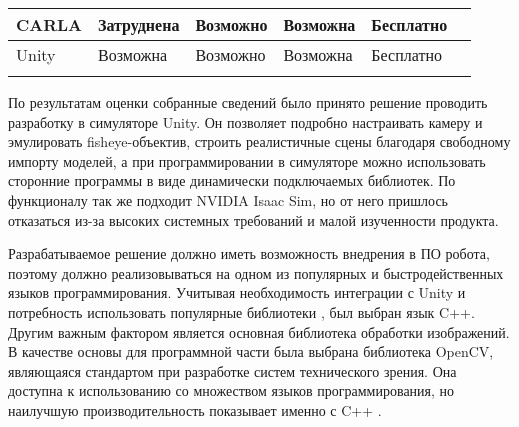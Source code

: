 \begin{table}[]
\begin{tabular}{|l|l|l|l|l|l|}
    CARLA             & Затруднена                                                                  & Возможно                                                                       & Возможна                                                            & Бесплатно            &                     \\ \hline
    Unity             & Возможна                                                                    & Возможно                                                                       & Возможна                                                            & Бесплатно            &                     \\ \hline
                      &                                                                             &                                                                                &                                                                     &                      &                     \\ \hline
    \end{tabular}
\end{table}

По результатам оценки собранные сведений было принято решение проводить разработку в симуляторе Unity. Он позволяет подробно настраивать камеру и эмулировать fisheye-объектив, 
строить реалистичные сцены благодаря свободному импорту моделей, а при программировании в симуляторе можно использовать сторонние программы в виде динамически подключаемых библиотек. 
По функционалу так же подходит NVIDIA Isaac Sim, но от него пришлось отказаться из-за высоких системных требований и малой изученности продукта.     %

Разрабатываемое решение должно иметь возможность внедрения в ПО робота, %
поэтому должно реализовываться на одном из популярных и быстродейственных языков программирования. Учитывая необходимость интеграции с Unity и потребность использовать популярные библиотеки
, был выбран язык C++.  Другим важным фактором является основная библиотека обработки изображений. В качестве основы для программной части была выбрана библиотека OpenCV, являющаяся стандартом 
при разработке систем технического зрения. Она доступна к использованию со множеством языков программирования, но наилучшую производительность показывает именно с C++ \cite{}.                              %